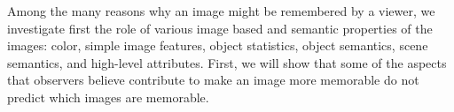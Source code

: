 



Among the many reasons why an image might be remembered by a viewer, we investigate first the role of various image based and semantic properties of the images: color, simple
image features, object statistics, object semantics, scene semantics, and high-level attributes. First, we will show that some of the aspects that observers believe contribute to make
an image more memorable do not predict which images are memorable.